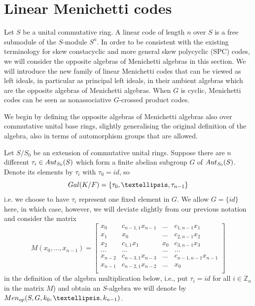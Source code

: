 \documentclass[11pt]{amsart}
\theoremstyle{plain}
\theoremstyle{definition}
\begin{document}
\section{Linear Menichetti  codes} \label{sec:codes}

Let $S$ be a unital commutative ring. A  linear code of length $n$ over $S$ is a free submodule of the $S$-module $S^n$.
In order to be consistent with the existing terminology for skew constacyclic and more general skew polycyclic (SPC) codes, we will  consider the opposite algebras of Menichetti algebras in this section. We will introduce the new  family of linear Menichetti codes that can be viewed as left ideals, in particular as principal left ideals, in their ambient algebras which are the opposite algebras of Menichetti algebras. When $G$ is cyclic, Menichetti codes can be seen as nonassociative $G$-crossed product  codes.

We begin by defining the opposite algebras of Menichetti algebras also over commutative unital base rings, slightly generalising the original definition of the algebra, also in terms of automorphism groups that are allowed.

 Let $S/S_0$ be an extension of commutative unital rings.
Suppose there are $n$ different $\tau_i\in {\rm Aut}_{S_0}(S)$ which form a finite abelian subgroup $G$ of ${\rm Aut}_{S_0}(S)$.
 Denote its elements by $\tau_i$ with $\tau_0=id$, so
$${\rm Gal}(K/F)=\{ \tau_0,\dots,\tau_{n-1} \}$$
i.e.  we choose to have $\tau_i$ represent one fixed element in $G$. We allow $G=\{id\}$ here, in which case, however, we will deviate slightly from our previous notation and consider the matrix
 \[ M(x_0,\dots,x_{n-1})=\left [\begin {array}{cccccc}
x_0 &  c_{{n-1},1}x_{n-1} & ... & c_{1,{n-1}} x_{1}\\
x_1 & x_0 & ... &  c_{2,{n-1}} x_{2}\\
x_2 & c_{1,1}x_{1} & x_0 & c_{3,{n-1}}x_{3}\\
...& ...  & ... & ...\\
x_{n-2} &  c_{n-3,1}x_{n-3}  & ...& c_{{n-1},{n-1}}x_{n-1}\\
x_{n-1} &  c_{n-2,1}x_{n-2}  & ...& x_{0}\\
\end {array}\right ]
 \]
in the definition of the algebra multiplication below, i.e., put $\tau_i=id$ for all $i \in \mathbb{Z}_n$ in the matrix $M$) and obtain an
$S$-algebra we will denote by ${\rm Men}_{op}(S,G, k_0,\dots,k_{n-1})$.
\end{document}
